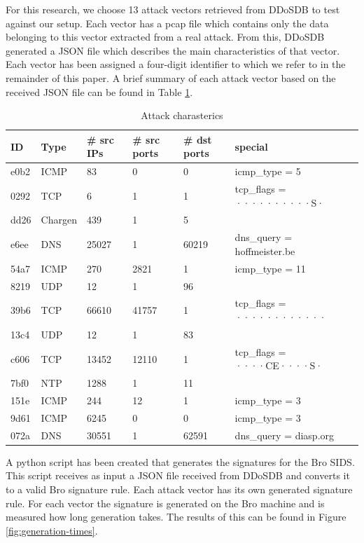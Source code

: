 For this research, we choose 13 attack vectors retrieved from DDoSDB to test against our setup. Each vector has a pcap file which contains only the data belonging to this vector extracted from a real attack. From this, DDoSDB generated a JSON file which describes the main characteristics of that vector. Each vector has been assigned a four-digit identifier to which we refer to in the remainder of this paper. A brief summary of each attack vector based on the received JSON file can be found in Table \ref{tab:json-summarry}.  


\begin{table}[H]
\centering
\begin{tabular}{l | l | l | l | l | l}
ID & Type & \# src IPs & \# src ports & \# dst ports & special  \\ \hline \hline
e0b2 & ICMP & 83 & 0 & 0 & icmp\_type = 5 \\ \hline
0292 & TCP & 6 & 1 & 1 & tcp\_flags = ··········S· \\ \hline
dd26 & Chargen & 439 & 1 & 5 &  \\ \hline
e6ee & DNS & 25027 & 1 & 60219 & dns\_query = hoffmeister.be \\ \hline
54a7 & ICMP & 270 & 2821 & 1 & icmp\_type = 11 \\ \hline
8219 & UDP & 12 & 1 & 96 &  \\ \hline
39b6 & TCP & 66610 & 41757 & 1 & tcp\_flags = ············ \\ \hline
13c4 & UDP & 12 & 1 & 83 &  \\ \hline
c606 & TCP & 13452 & 12110 & 1 & tcp\_flags = ····CE····S· \\ \hline
7bf0 & NTP & 1288 & 1 & 11 &  \\ \hline
151e & ICMP & 244 & 12 & 1 & icmp\_type = 3 \\ \hline
9d61 & ICMP & 6245 & 0 & 0 & icmp\_type = 3 \\ \hline
072a & DNS & 30551 & 1 & 62591 & dns\_query = diasp.org
\end{tabular}
\caption{\label{tab:json-summarry}Attack charasterics}
\end{table}

A python script has been created that generates the signatures for the Bro SIDS. This script receives as input a JSON file received from DDoSDB and converts it to a valid Bro signature rule. Each attack vector has its own generated signature rule. For each vector the signature is generated on the Bro machine and is measured how long generation takes. The results of this can be found in Figure \ref{fig:generation-times}.

